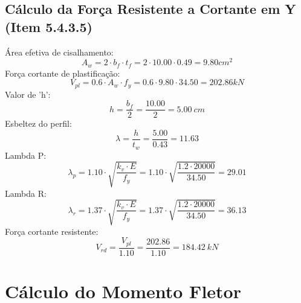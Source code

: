 \documentclass{article}%
\begin{document}
\subsection{Cálculo da Força Resistente a Cortante em Y (Item 5.4.3.5)}%
\label{subsec:ClculodaForaResistenteaCortanteemY(Item5.4.3.5)}%
Área efetiva de cisalhamento:%
\[%
A_w = 2 \cdot b_f \cdot t_f = 2 \cdot 10.00 \cdot 0.49  = 9.80    {cm}^2%
\]%
Força cortante de plastificação:%
\[%
V_{pl} = 0.6 \cdot A_w \cdot f_y = 0.6 \cdot 9.80 \cdot 34.50 = 202.86    kN%
\]%
Valor de 'h':%
\[%
h = \frac{b_f}{2} = \frac{10.00}{2} = 5.00 \ cm%
\]%
Esbeltez do perfil:%
\[%
\lambda = \frac{h}{t_w} = \frac{5.00}{0.43} = 11.63%
\]%
Lambda P:%
\[%
\lambda_p = 1.10 \cdot \sqrt{\frac{{k_v \cdot E}}{{f_y}}} = 1.10 \cdot \sqrt{\frac{{1.2 \cdot 20000}}{{34.50}}} = 29.01%
\]%
Lambda R:%
\[%
\lambda_r = 1.37 \cdot \sqrt{\frac{{k_v \cdot E}}{{f_y}}} = 1.37 \cdot \sqrt{\frac{{1.2 \cdot 20000}}{{34.50}}} = 36.13 %
\]%
Força cortante resistente:%
\[%
V_{rd} = \frac{V_{pl}}{1.10}  = \frac{202.86}{1.10} = 184.42   ~   kN%
\]

%
\section{Cálculo do Momento Fletor}%
\label{sec:ClculodoMomentoFletor}%

%
\end{document}
